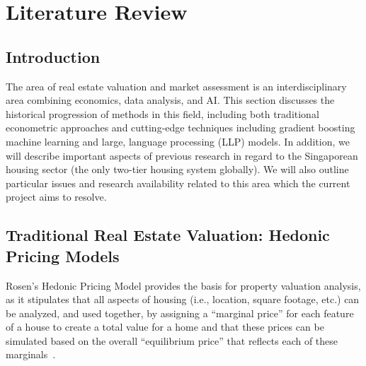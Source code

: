 \chapter{Literature Review}

\section{Introduction}

The area of real estate valuation and market assessment is an interdisciplinary area combining economics, data analysis, and AI. This section discusses the historical progression of methods in this field, including both traditional econometric approaches and cutting-edge techniques including gradient boosting machine learning and large, language processing (LLP) models. In addition, we will describe important aspects of previous research in regard to the Singaporean housing sector (the only two-tier housing system globally). We will also outline particular issues and research availability related to this area which the current project aims to resolve.

\section{Traditional Real Estate Valuation: Hedonic Pricing Models}

Rosen's Hedonic Pricing Model provides the basis for property valuation analysis, 
as it stipulates that all aspects of housing (i.e., location, square footage, 
etc.) can be analyzed, and used together, by assigning a ``marginal price'' for 
each feature of a house to create a total value for a home and that these 
prices can be simulated based on the overall ``equilibrium price'' that 
reflects each of these marginals~\cite{rosen1974hedonic}.

